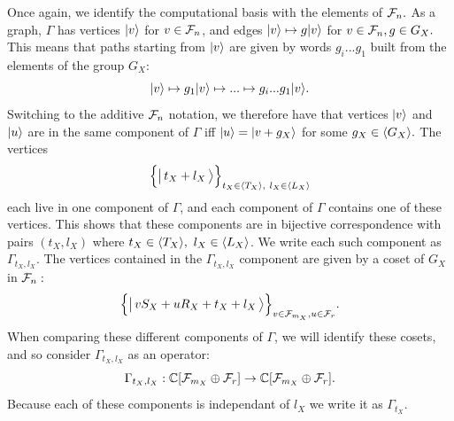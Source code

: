 \doproof
Once again, we identify the computational basis with
the elements of $\mathcal{F}_n.$
As a graph, $\Gamma$ has vertices 
$|{v}\rangle $ for $v\in\mathcal{F}_n$, and edges 
$ |{v}\rangle \mapsto g |{v}\rangle$ for  $v\in\mathcal{F}_{n}, g\in G_X.$
This means that paths starting from $|{v}\rangle$ are given by
words $g_i...g_1$ built from the elements of the group $G_X:$
$$
    |{v}\rangle \mapsto g_1 |{v}\rangle \mapsto ... \mapsto g_i...g_1 |{v}\rangle.
$$
Switching to the additive $\mathcal{F}_n$ notation, we
therefore have that 
vertices $|{v}\rangle$ and $|{u}\rangle$ are in the
same component of $\Gamma$ iff $|{u}\rangle = |{v+g_X}\rangle$ for some $g_X\in\langle G_X \rangle.$
The vertices
$$\Bigl\{ \bigl|\,{t_X + l_X}\,\bigr\rangle \Bigr\}_{t_X\in\langle T_X \rangle,\ l_X\in\langle L_X \rangle}$$
each live in one component of $\Gamma$,
and each component of $\Gamma$ contains one of these vertices.
This shows that these components are in bijective correspondence with
pairs $(t_X, l_X)$ where $t_X\in\Span{T_X},\ l_X\in\Span{L_X}$.
We write each such component as $\Gamma_{t_X,l_X}$.
The vertices contained in the $\Gamma_{t_X,l_X}$ component
are given by a coset of $G_X$ in $\mathcal{F}_{n}:$
$$
    \Bigl\{ \bigl|\,{v S_X + u R_X + t_X + l_X}\,\bigr\rangle \Bigr\}_{v\in \mathcal{F}_{m_X}, u\in\mathcal{F}_{r}}.
$$
When comparing these different components of $\Gamma$, we will
identify these cosets, and so consider $\Gamma_{t_X,l_X}$ as an
operator:
$$
    \Gamma_{t_X,l_X} : \mathbb{C}[\mathcal{F}_{m_X}\oplus\mathcal{F}_r] \to \mathbb{C}[\mathcal{F}_{m_X}\oplus\mathcal{F}_r].
$$
Because each of these components is independant of $l_X$ we write it as $\Gamma_{t_X}.$
\tombstone




